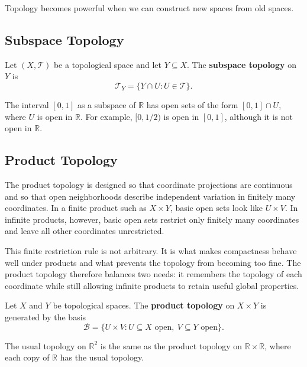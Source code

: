 Topology becomes powerful when we can construct new spaces from old spaces.

\subsection{Subspace Topology}

\begin{definition}
Let $(X,\mathcal{T})$ be a topological space and let $Y\subseteq X$. The \textbf{subspace topology} on $Y$ is
\[
    \mathcal{T}_Y=\{Y\cap U:U\in\mathcal{T}\}.
\]
\end{definition}

\begin{example}
The interval $[0,1]$ as a subspace of $\mathbb{R}$ has open sets of the form $[0,1]\cap U$, where $U$ is open in $\mathbb{R}$. For example, $[0,1/2)$ is open in $[0,1]$, although it is not open in $\mathbb{R}$.
\end{example}

\subsection{Product Topology}


The product topology is designed so that coordinate projections are continuous and so that open neighborhoods describe independent variation in finitely many coordinates. In a finite product such as $X\times Y$, basic open sets look like $U\times V$. In infinite products, however, basic open sets restrict only finitely many coordinates and leave all other coordinates unrestricted.

This finite restriction rule is not arbitrary. It is what makes compactness behave well under products and what prevents the topology from becoming too fine. The product topology therefore balances two needs: it remembers the topology of each coordinate while still allowing infinite products to retain useful global properties.

\begin{definition}
Let $X$ and $Y$ be topological spaces. The \textbf{product topology} on $X\times Y$ is generated by the basis
\[
    \mathcal{B}=\{U\times V:U\subseteq X\text{ open},\ V\subseteq Y\text{ open}\}.
\]
\end{definition}

\begin{example}
The usual topology on $\mathbb{R}^2$ is the same as the product topology on $\mathbb{R}\times\mathbb{R}$, where each copy of $\mathbb{R}$ has the usual topology.
\end{example}

